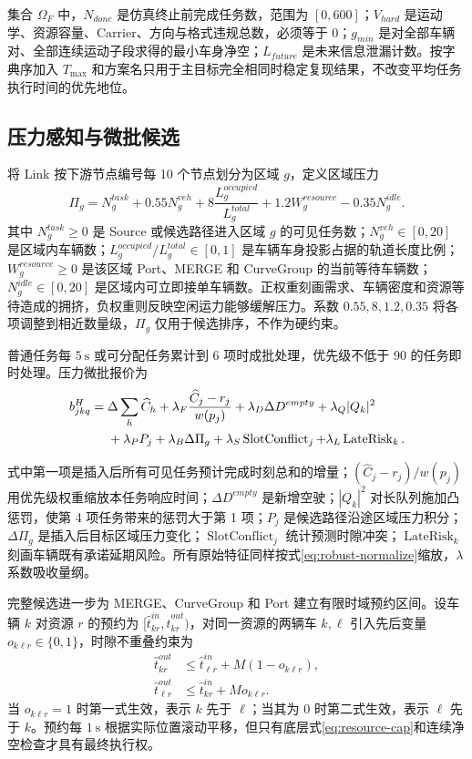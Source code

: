 \documentclass[UTF8]{ctexart}
\begin{document}
集合 $\Omega_F$ 中，$N_{done}$ 是仿真终止前完成任务数，范围为 $[0,600]$；$V_{hard}$ 是运动学、资源容量、Carrier、方向与格式违规总数，必须等于 0；$g_{min}$ 是对全部车辆对、全部连续运动子段求得的最小车身净空；$L_{future}$ 是未来信息泄漏计数。按字典序加入 $T_{\max}$ 和方案名只用于主目标完全相同时稳定复现结果，不改变平均任务执行时间的优先地位。

\subsection{压力感知与微批候选}

将 Link 按下游节点编号每 10 个节点划分为区域 $g$，定义区域压力
\begin{equation}\label{eq:pressure}
\Pi_g=N_g^{task}+0.55N_g^{veh}+8\frac{L_g^{occupied}}{L_g^{total}}
+1.2W_g^{resource}-0.35N_g^{idle}.
\end{equation}
其中 $N_g^{task}\ge0$ 是 Source 或候选路径进入区域 $g$ 的可见任务数；$N_g^{veh}\in[0,20]$ 是区域内车辆数；$L_g^{occupied}/L_g^{total}\in[0,1]$ 是车辆车身投影占据的轨道长度比例；$W_g^{resource}\ge0$ 是该区域 Port、MERGE 和 CurveGroup 的当前等待车辆数；$N_g^{idle}\in[0,20]$ 是区域内可立即接单车辆数。正权重刻画需求、车辆密度和资源等待造成的拥挤，负权重则反映空闲运力能够缓解压力。系数 $0.55,8,1.2,0.35$ 将各项调整到相近数量级，$\Pi_g$ 仅用于候选排序，不作为硬约束。

普通任务每 $5\ \mathrm{s}$ 或可分配任务累计到 6 项时成批处理，优先级不低于 90 的任务即时处理。压力微批报价为
\begin{align}
b_{jkq}^{H}={}&\Delta\sum_h\widehat C_h
+\lambda_F\frac{\widehat C_j-r_j}{w(p_j)}+\lambda_D\Delta D^{empty}
+\lambda_Q|Q_k|^2\notag\\
&+\lambda_P P_j+\lambda_B\Delta\Pi_g
+\lambda_S\operatorname{SlotConflict}_j+\lambda_L\operatorname{LateRisk}_k.
\end{align}

式中第一项是插入后所有可见任务预计完成时刻总和的增量；$(\widehat C_j-r_j)/w(p_j)$ 用优先级权重缩放本任务响应时间；$\Delta D^{empty}$ 是新增空驶；$|Q_k|^2$ 对长队列施加凸惩罚，使第 4 项任务带来的惩罚大于第 1 项；$P_j$ 是候选路径沿途区域压力积分；$\Delta\Pi_g$ 是插入后目标区域压力变化；$\operatorname{SlotConflict}_j$ 统计预测时隙冲突；$\operatorname{LateRisk}_k$ 刻画车辆既有承诺延期风险。所有原始特征同样按式\eqref{eq:robust-normalize}缩放，$\lambda$ 系数吸收量纲。

完整候选进一步为 MERGE、CurveGroup 和 Port 建立有限时域预约区间。设车辆 $k$ 对资源 $r$ 的预约为 $[\hat t_{kr}^{in},\hat t_{kr}^{out})$，对同一资源的两辆车 $k,\ell$ 引入先后变量 $o_{k\ell r}\in\{0,1\}$，时隙不重叠约束为
\begin{align}
\hat t_{kr}^{out}&\le\hat t_{\ell r}^{in}+M(1-o_{k\ell r}),\\
\hat t_{\ell r}^{out}&\le\hat t_{kr}^{in}+Mo_{k\ell r}.
\end{align}
当 $o_{k\ell r}=1$ 时第一式生效，表示 $k$ 先于 $\ell$；当其为 0 时第二式生效，表示 $\ell$ 先于 $k$。预约每 $1\ \mathrm{s}$ 根据实际位置滚动平移，但只有底层式\eqref{eq:resource-cap}和连续净空检查才具有最终执行权。
\end{document}
